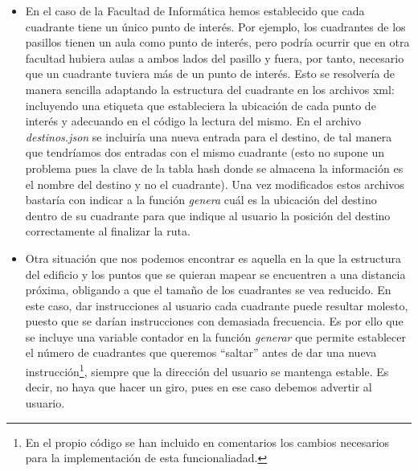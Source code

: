 \begin{itemize}
	\item En el caso de la Facultad de Informática hemos establecido que cada cuadrante tiene un único punto de interés. Por ejemplo, los cuadrantes de los pasillos tienen un aula como punto de interés, pero podría ocurrir que en otra facultad hubiera aulas a ambos lados del pasillo y fuera, por tanto, necesario que un cuadrante tuviera más de un punto de interés. Esto se resolvería de manera sencilla adaptando la estructura del cuadrante en los archivos xml: incluyendo una etiqueta que estableciera la ubicación de cada punto de interés y adecuando en el código la lectura del mismo. En el archivo \textit{destinos.json} se incluiría una nueva entrada para el destino, de tal manera que tendríamos dos entradas con el mismo cuadrante (esto no supone un problema pues la clave de la tabla hash donde se almacena la información es el nombre del destino y no el cuadrante). Una vez modificados estos archivos bastaría con indicar a la función \textit{genera} cuál es la ubicación del destino dentro de su cuadrante para que indique al usuario la posición del destino correctamente al finalizar la ruta.
	
	\item Otra situación que nos podemos encontrar es aquella en la que la estructura del edificio y los puntos que se quieran mapear se encuentren a una distancia próxima, obligando a que el tamaño de los cuadrantes se vea reducido. En este caso, dar instrucciones al usuario cada cuadrante puede resultar molesto, puesto que se darían instrucciones con demasiada frecuencia. Es por ello que se incluye una variable contador en la función \textit{generar} que permite establecer el número de cuadrantes que queremos ``saltar'' antes de dar una nueva instrucción\footnote{En el propio código se han incluido en comentarios los cambios necesarios para la implementación de esta funcionaliadad.}, siempre que la dirección del usuario se mantenga estable. Es decir, no haya que hacer un giro, pues en ese caso debemos advertir al usuario.
\end{itemize}





